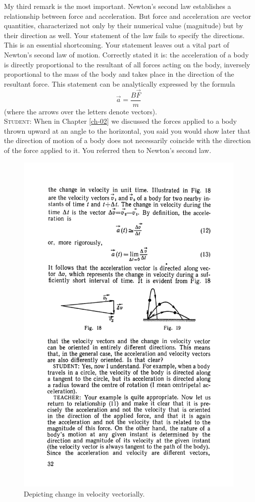\documentclass[a4paper,sfsidenotes]{tufte-book}
\begin{document}
My third remark is the most important. Newton's second law establishes a relationship between force and acceleration. But force and acceleration are vector quantities, characterized not only by their numerical value (magnitude) but by their direction as well. Your statement of the law fails to specify
the directions. This is an essential shortcoming. Your statement leaves out a vital part of Newton's second law of motion. Correctly stated it is: the acceleration of a body is directly proportional to the resultant of all forces acting on the body, inversely proportional to the mass of the body and takes place
in the direction of the resultant force. This statement can be analytically expressed by the formula
\begin{equation}
\vec{a}=\frac{B\vec{F}}{m}
\label{eq-11}
\end{equation}
(where the arrows over the letters denote vectors).\\
\textsc{Student:} When in  Chapter \ref{ch-02} we discussed the forces applied to a body thrown upward at an angle to the horizontal, you said you would show later that the direction of motion of a body does not necessarily coincide with the direction of the force applied to it. You referred then to Newton's second law.\\
\begin{figure}
\centering
\includegraphics[width=0.55\linewidth]{fig-018a.pdf}
\caption{Depicting change in velocity vectorially.}
\label{fig-18}
\end{figure}
\end{document}
